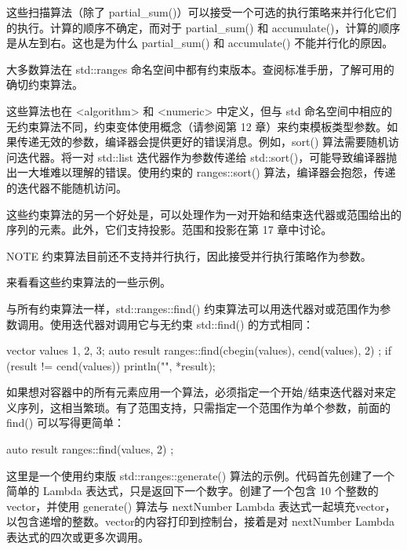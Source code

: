 这些扫描算法（除了 partial\_sum()）可以接受一个可选的执行策略来并行化它们的执行。计算的顺序不确定，而对于 partial\_sum() 和 accumulate()，计算的顺序是从左到右。这也是为什么 partial\_sum() 和 accumulate() 不能并行化的原因。


大多数算法在 std::ranges 命名空间中都有约束版本。查阅标准手册，了解可用的确切约束算法。

这些算法也在 <algorithm> 和 <numeric> 中定义，但与 std 命名空间中相应的无约束算法不同，约束变体使用概念（请参阅第 12 章）来约束模板类型参数。如果传递无效的参数，编译器会提供更好的错误消息。例如，sort() 算法需要随机访问迭代器。将一对 std::list 迭代器作为参数传递给 std::sort()，可能导致编译器抛出一大堆难以理解的错误。使用约束的 ranges::sort() 算法，编译器会抱怨，传递的迭代器不能随机访问。

这些约束算法的另一个好处是，可以处理作为一对开始和结束迭代器或范围给出的序列的元素。此外，它们支持投影。范围和投影在第 17 章中讨论。

\begin{myNotic}{NOTE}
约束算法目前还不支持并行执行，因此接受并行执行策略作为参数。
\end{myNotic}

来看看这些约束算法的一些示例。


与所有约束算法一样，std::ranges::find() 约束算法可以用迭代器对或范围作为参数调用。使用迭代器对调用它与无约束 std::find() 的方式相同：

\begin{cpp}
vector values {1, 2, 3};
auto result { ranges::find(cbegin(values), cend(values), 2) };
if (result != cend(values)) { println("{}", *result); }
\end{cpp}

如果想对容器中的所有元素应用一个算法，必须指定一个开始/结束迭代器对来定义序列，这相当繁琐。有了范围支持，只需指定一个范围作为单个参数，前面的 find() 可以写得更简单：

\begin{cpp}
auto result { ranges::find(values, 2) };
\end{cpp}


这里是一个使用约束版 std::ranges::generate() 算法的示例。代码首先创建了一个简单的 Lambda 表达式，只是返回下一个数字。创建了一个包含 10 个整数的vector，并使用 generate() 算法与 nextNumber Lambda 表达式一起填充vector，以包含递增的整数。vector的内容打印到控制台，接着是对 nextNumber Lambda 表达式的四次或更多次调用。

